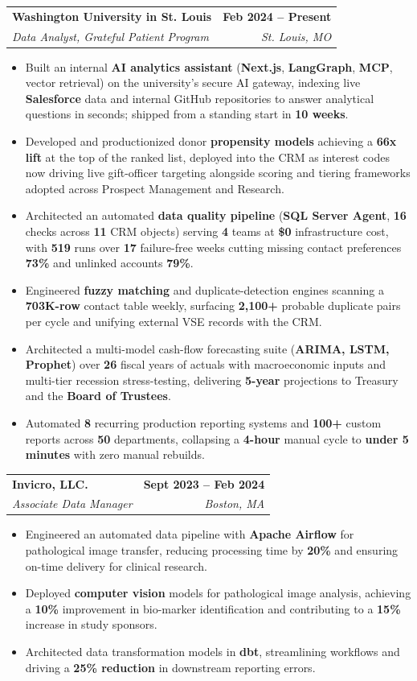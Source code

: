 \documentclass[letterpaper,11pt]{article}
\makeatletter
\newcommand{\resumeItem}[1]{\item\small{{#1 \vspace{-3pt}}}}
\newcommand{\resumeSubheading}[4]{
  \vspace{-2pt}\item
    \begin{tabular*}{1.0\textwidth}[t]{l@{\extracolsep{\fill}}r}
      \textbf{#1} & \textbf{\small #2} \\
      \textit{\small#3} & \textit{\small #4} \\
    \end{tabular*}\vspace{-9pt}
}
\newcommand{\resumeItemListStart}{\begin{itemize}[label=\textbullet]}
\newcommand{\resumeItemListEnd}{\end{itemize}\vspace{-8pt}}
\makeatother
\begin{document}
  \resumeSubheading
      {Washington University in St. Louis}{Feb 2024 -- Present}
      {Data Analyst, Grateful Patient Program}{St. Louis, MO}
    \resumeItemListStart
        \resumeItem{Built an internal \textbf{AI analytics assistant} (\textbf{Next.js}, \textbf{LangGraph}, \textbf{MCP}, vector retrieval) on the university's secure AI gateway, indexing live \textbf{Salesforce} data and internal GitHub repositories to answer analytical questions in seconds; shipped from a standing start in \textbf{10 weeks}.}
        \resumeItem{Developed and productionized donor \textbf{propensity models} achieving a \textbf{66x lift} at the top of the ranked list, deployed into the CRM as interest codes now driving live gift-officer targeting alongside scoring and tiering frameworks adopted across Prospect Management and Research.}
        \resumeItem{Architected an automated \textbf{data quality pipeline} (\textbf{SQL Server Agent}, \textbf{16} checks across \textbf{11} CRM objects) serving \textbf{4} teams at \textbf{\$0} infrastructure cost, with \textbf{519} runs over \textbf{17} failure-free weeks cutting missing contact preferences \textbf{73\%} and unlinked accounts \textbf{79\%}.}
        \resumeItem{Engineered \textbf{fuzzy matching} and duplicate-detection engines scanning a \textbf{703K-row} contact table weekly, surfacing \textbf{2,100+} probable duplicate pairs per cycle and unifying external VSE records with the CRM.}
        \resumeItem{Architected a multi-model cash-flow forecasting suite (\textbf{ARIMA, LSTM, Prophet}) over \textbf{26} fiscal years of actuals with macroeconomic inputs and multi-tier recession stress-testing, delivering \textbf{5-year} projections to Treasury and the \textbf{Board of Trustees}.}
        \resumeItem{Automated \textbf{8} recurring production reporting systems and \textbf{100+} custom reports across \textbf{50} departments, collapsing a \textbf{4-hour} manual cycle to \textbf{under 5 minutes} with zero manual rebuilds.}
    \resumeItemListEnd

  \resumeSubheading
      {Invicro, LLC.}{Sept 2023 -- Feb 2024}
      {Associate Data Manager}{Boston, MA}
      \resumeItemListStart
        \resumeItem{Engineered an automated data pipeline with \textbf{Apache Airflow} for pathological image transfer, reducing processing time by \textbf{20\%} and ensuring on-time delivery for clinical research.}
        \resumeItem{Deployed \textbf{computer vision} models for pathological image analysis, achieving a \textbf{10\%} improvement in bio-marker identification and contributing to a \textbf{15\%} increase in study sponsors.}
        \resumeItem{Architected data transformation models in \textbf{dbt}, streamlining workflows and driving a \textbf{25\% reduction} in downstream reporting errors.}
      \resumeItemListEnd
\end{document}
